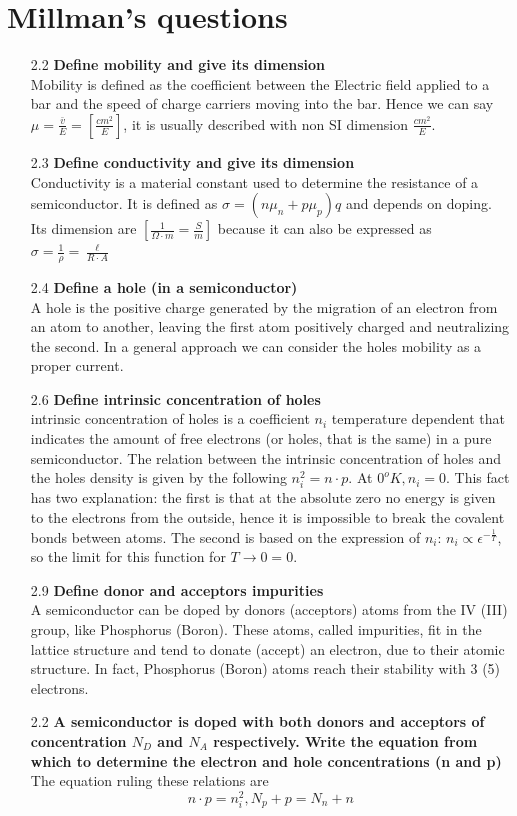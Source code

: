 \documentclass[12pt]{article}
\newcommand{\B}{\textbf}
\begin{document}
\newpage
\section{Millman's questions}
\begin{itemize}
	\item[2.2] \B{Define mobility and give its dimension}\\ 
	Mobility is defined as the coefficient between the Electric field applied to a bar and the speed of charge carriers moving into the bar. Hence we can say $\mu = \frac{\bar v}{E} = [\frac{cm^2}{E}]$, it is usually described with non SI dimension $\frac{cm^2}{E}$.
	\item[2.3] \B{Define conductivity and give its dimension}\\ 
	 Conductivity is a material constant used to determine the resistance of a semiconductor. It is defined as $\sigma = (n\mu_n + p\mu_p)q$ and depends on doping. Its dimension are $[\frac{1}{\Omega \cdot m} = \frac{S}{m}]$ because it can also be expressed as $\sigma = \frac{1}{\rho} = \frac{\ell}{R\cdot A}$
	\item[2.4] \B{Define a hole (in a semiconductor)}\\ 
	A hole is the positive charge generated by the migration of an electron from an atom to another, leaving the first atom positively charged and neutralizing the second. In a general approach we can consider the holes mobility as a proper current. 
	\item[2.6] \B{Define intrinsic concentration of holes}\\
	 intrinsic concentration of holes is a coefficient $n_i$ temperature dependent that indicates the amount of free electrons (or holes, that is the same) in a pure semiconductor. The relation between the intrinsic concentration of holes and the holes density is given by the following $n_i^2 = n \cdot p$. At $0^o K, n_i = 0$. This fact has two explanation: the first is that at the absolute zero no energy is given to the electrons from the outside, hence it is impossible to break the covalent bonds between atoms. The second is based on the expression of $n_i$: $n_i \propto \epsilon^{-\frac{1}{T}}$, so the limit for this function for $T\rightarrow0 = 0$. 
	\item[2.9] \B{Define donor and acceptors impurities}\\ 
	A semiconductor can be doped by donors (acceptors) atoms from the IV (III) group, like Phosphorus (Boron). These atoms, called impurities, fit in the lattice structure and tend to donate (accept) an electron, due to their atomic structure. In fact, Phosphorus (Boron) atoms reach their stability with 3 (5) electrons. 
	\item[2.2] \B{A semiconductor is doped with both donors and acceptors of concentration $N_D$ and $N_A$ respectively. Write the equation from which to determine the electron and hole concentrations (n and p)}\\
	The equation ruling these relations are 
	\[
{n \cdot p = n_i^2}, {N_p + p = N_n + n}
	\]
	
\end{itemize}
\end{document}
